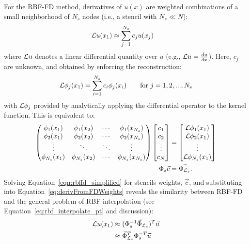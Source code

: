 For the RBF-FD method, derivatives of $u(x)$ are weighted combinations of a small neighborhood of $N_s$ nodes (i.e., a stencil with $N_s \ll N$):
        \begin{align} 
        \mathcal{L}u(x_1) &\approx \sum_{j=1}^{N_s} c_j u(x_j) \nonumber 
        \label{eq:derivFromFDWeights}
        \end{align}
where $\mathcal{L}u$ denotes a linear differential quantity over $u$ (e.g., $\mathcal{L}u = \frac{d u}{d x}$). Here, ${c_j}$ are unknown, and obtained by enforcing the reconstruction:
	\begin{align}
	        \mathcal{L}\phi_j(x_1) = \sum_{i=1}^{N_s} c_i \phi_j(x_i) \ \ \ \ \ \ \textrm{for }j=1,2,...,N_s \nonumber 
	\end{align}
with $\mathcal{L}\phi_j$ provided by analytically applying the differential operator to the kernel function.
This is equivalent to: 
	\begin{align}        
          \begin{pmatrix}  
            \phi_1(x_1) & \phi_1(x_2) & \cdots & \phi_1(x_{N_s}) \\ 
            \phi_2(x_1) & \phi_2(x_2) & \cdots & \phi_2(x_{N_s}) \\ 
            \vdots & \ddots & \ddots & \vdots \\
            \phi_{N_s}(x_1) & \phi_{N_s}(x_2) & \cdots & \phi_{N_s}(x_{N_s})
                \end{pmatrix} 
                \begin{bmatrix} c_1 \\ c_2 \\ \vdots \\ c_N \end{bmatrix}
               &=                \begin{bmatrix} \diffop{\phi_1}(x_1) \\  \diffop{\phi_2}(x_1) \\ \vdots \\  \diffop{\phi_{N_s}}(x_1) 
               \end{bmatrix} \\
                         \Phi_{s} \vec{c} &= \vec{\Phi_{\diffop{}_s}}.%
                         \label{eqn:rbffd_simplified}
        \end{align} 
Solving Equation~\ref{eqn:rbffd_simplified} for stencils weights, $\vec{c}$, and substituting into Equation~\ref{eq:derivFromFDWeights} reveals the similarity between RBF-FD and the general problem of RBF interpolation (see Equation~\ref{eq:rbf_interpolate_pt} and discussion): 
        \begin{align*} 
        \mathcal{L}u(x_1) &\approx (\Phi^{-1}_s \vec{\Phi}_{\mathcal{L}_s})^T \vec{u} \\
        &\approx \vec{\Phi}_{\mathcal{L}_s}^T \Phi^{-T}_s \vec{u}
        \label{eq:rbffd_approx_derivs}
        \end{align*}
        
